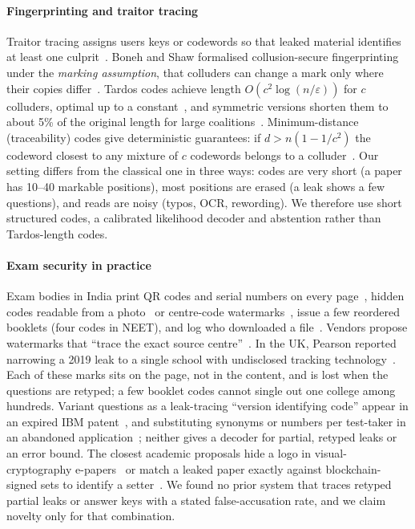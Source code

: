 \documentclass[10pt,a4paper]{article}
\theoremstyle{remark}
\begin{document}
\paragraph{Fingerprinting and traitor tracing} Traitor tracing assigns users keys or codewords so that leaked material identifies at least one culprit~\citep{chor1994,chor2000}. Boneh and Shaw formalised collusion-secure fingerprinting under the \emph{marking assumption}, that colluders can change a mark only where their copies differ~\citep{boneh1998}. Tardos codes achieve length $O(c^2\log(n/\varepsilon))$ for $c$ colluders, optimal up to a constant~\citep{tardos2008}, and symmetric versions shorten them to about 5\% of the original length for large coalitions~\citep{laarhoven2014}. Minimum-distance (traceability) codes give deterministic guarantees: if $d > n(1-1/c^2)$ the codeword closest to any mixture of $c$ codewords belongs to a colluder~\citep{staddon2001}. Our setting differs from the classical one in three ways: codes are very short (a paper has 10--40 markable positions), most positions are erased (a leak shows a few questions), and reads are noisy (typos, OCR, rewording). We therefore use short structured codes, a calibrated likelihood decoder and abstention rather than Tardos-length codes.

\paragraph{Exam security in practice} Exam bodies in India print QR codes and serial numbers on every page~\citep{tribune2023haryana,sakshi2025tsssc}, hidden codes readable from a photo~\citep{dh2024wbbse} or centre-code watermarks~\citep{tnm2018cbse,nios2026}, issue a few reordered booklets (four codes in NEET), and log who downloaded a file~\citep{uniapps}. Vendors propose watermarks that \enquote{trace the exact source centre}~\citep{eklavvya2026}. In the UK, Pearson reported narrowing a 2019 leak to a single school with undisclosed tracking technology~\citep{pearson2019}. Each of these marks sits on the page, not in the content, and is lost when the questions are retyped; a few booklet codes cannot single out one college among hundreds. Variant questions as a leak-tracing \enquote{version identifying code} appear in an expired IBM patent~\citep{ibm2007}, and substituting synonyms or numbers per test-taker in an abandoned application~\citep{crowhurst2005}; neither gives a decoder for partial, retyped leaks or an error bound. The closest academic proposals hide a logo in visual-cryptography e-papers~\citep{fathimal2019} or match a leaked paper exactly against blockchain-signed sets to identify a setter~\citep{rahman2021}. We found no prior system that traces retyped partial leaks or answer keys with a stated false-accusation rate, and we claim novelty only for that combination.
\end{document}
